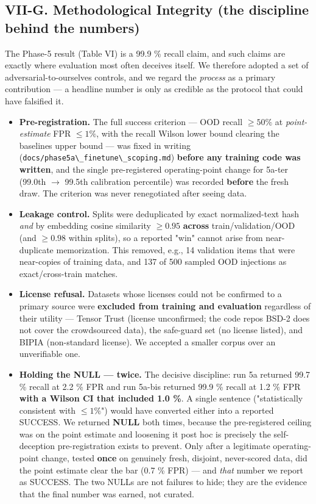 \subsection{VII-G. Methodological Integrity (the discipline behind the
numbers)}\label{vii-g-methodological-integrity-the-discipline-behind-the-numbers}

The Phase-5 result (Table VI) is a 99.9 \% recall claim, and such claims
are exactly where evaluation most often deceives itself. We therefore
adopted a set of adversarial-to-ourselves controls, and we regard the
\emph{process} as a primary contribution --- a headline number is only
as credible as the protocol that could have falsified it.

\begin{itemize}
\tightlist
\item
  \textbf{Pre-registration.} The full success criterion --- OOD recall
  \(\ge 50\%\) at \emph{point-estimate} FPR \(\le 1\%\), with the recall
  Wilson lower bound clearing the baseline\textquotesingle s upper bound
  --- was fixed in writing
  (\passthrough{\lstinline!docs/phase5a\_finetune\_scoping.md!})
  \textbf{before any training code was written}, and the single
  pre-registered operating-point change for 5a-ter (99.0th \(\to\)
  99.5th calibration percentile) was recorded \textbf{before} the fresh
  draw. The criterion was never renegotiated after seeing data.
\item
  \textbf{Leakage control.} Splits were deduplicated by exact
  normalized-text hash \emph{and} by embedding cosine similarity
  \(\ge 0.95\) \textbf{across} train/validation/OOD (and \(\ge 0.98\)
  within splits), so a reported "win" cannot arise from near-duplicate
  memorization. This removed, e.g., 14 validation items that were
  near-copies of training data, and 137 of 500 sampled OOD injections as
  exact/cross-train matches.
\item
  \textbf{License refusal.} Datasets whose licenses could not be
  confirmed to a primary source were \textbf{excluded from training and
  evaluation} regardless of their utility --- Tensor Trust (license
  unconfirmed; the code repo\textquotesingle s BSD-2 does not cover the
  crowdsourced data), the safe-guard set (no license listed), and BIPIA
  (non-standard license). We accepted a smaller corpus over an
  unverifiable one.
\item
  \textbf{Holding the NULL --- twice.} The decisive discipline: run 5a
  returned 99.7 \% recall at 2.2 \% FPR and run 5a-bis returned 99.9 \%
  recall at 1.2 \% FPR \textbf{with a Wilson CI that included 1.0 \%}. A
  single sentence ("statistically consistent with \(\le 1\%\)") would
  have converted either into a reported SUCCESS. We returned
  \textbf{NULL} both times, because the pre-registered ceiling was on
  the point estimate and loosening it post hoc is precisely the
  self-deception pre-registration exists to prevent. Only after a
  legitimate operating-point change, tested \textbf{once} on genuinely
  fresh, disjoint, never-scored data, did the point estimate clear the
  bar (0.7 \% FPR) --- and \emph{that} number we report as SUCCESS. The
  two NULLs are not failures to hide; they are the evidence that the
  final number was earned, not curated.
\end{itemize}

